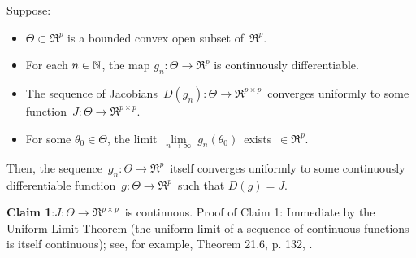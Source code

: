\clearpage

\begin{lemma}
\mbox{}\vskip 0.1cm
\noindent
Suppose:
\begin{itemize}
\item
	$\Theta \subset \Re^{p}$ is a bounded convex open subset of \,$\Re^{p}$.
\item
	For each $n\in\mathbb{N}$, the map $g_{n} : \Theta \longrightarrow \Re^{p}$ is continuously differentiable.
\item
	The sequence of Jacobians
	\,$D(g_{n}) : \Theta \longrightarrow \Re^{p \times p}$\,
	converges uniformly to some function
	\,$J : \Theta \longrightarrow \Re^{p \times p}$.
\item
	For some $\theta_{0} \in \Theta$, the limit
	\,$\underset{n\rightarrow\infty}{\lim}\;g_{n}(\theta_{0})$\,
	exists \,$\in \Re^{p}$.
\end{itemize}
Then, the sequence
\,$g_{n} : \Theta \longrightarrow \Re^{p}$\,
itself converges uniformly to some continuously differentiable function
\,$g : \Theta \longrightarrow \Re^{p}$\,
such that $D(g) = J$.
\end{lemma}
\proof

\vskip 0.5cm
\noindent
\textbf{Claim 1}:\quad $J : \Theta \longrightarrow \Re^{p \times p}$\, is continuous.
\vskip 0.1cm
\noindent
Proof of Claim 1:\quad
Immediate by the Uniform Limit Theorem (the uniform limit of a sequence of continuous functions is itself continuous);
see, for example, Theorem 21.6, p. 132, \cite{Munkres2000}.

